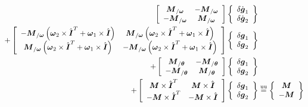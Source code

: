 \documentclass[10pt,dvips,fleqn,subeqn]{report}
\newcommand{\T}[1]{\boldsymbol{#1}}
\newcommand{\equu}{\overset{\text{uu}}{=}}
\begin{document}
\begin{align}
	\sqbr{\matr{cc}{
		\T{M}_{/\T{\omega}} & - \T{M}_{/\T{\omega}} \\
		- \T{M}_{/\T{\omega}} & \T{M}_{/\T{\omega}}
	}} \cubr{\cvvect{
		\delta\dot{\T{g}}_1 \\
		\delta\dot{\T{g}}_2
	}} & \nonumber \\
	+ \sqbr{\matr{cc}{
		- \T{M}_{/\T{\omega}} \plbr{\T{\omega}_2 \times \hat{\T{I}}^T + \T{\omega}_1\times \hat{\T{I}}}
			& \T{M}_{/\T{\omega}} \plbr{\T{\omega}_2 \times \hat{\T{I}}^T + \T{\omega}_1\times \hat{\T{I}}} \\
		\T{M}_{/\T{\omega}} \plbr{\T{\omega}_2\times \hat{\T{I}}^T + \T{\omega}_1\times \hat{\T{I}}}
			& - \T{M}_{/\T{\omega}} \plbr{\T{\omega}_2 \times \hat{\T{I}}^T + \T{\omega}_1\times \hat{\T{I}}}
	}} \cubr{\cvvect{
		\delta\T{g}_1 \\
		\delta\T{g}_2
	}} & \nonumber \\
	+ \sqbr{\matr{cc}{
		\T{M}_{/\T{\theta}} & - \T{M}_{/\T{\theta}} \\
		- \T{M}_{/\T{\theta}} & \T{M}_{/\T{\theta}}
	}} \cubr{\cvvect{
		\delta\T{g}_1 \\
		\delta\T{g}_2
	}} & \nonumber \\
	+ \sqbr{\matr{cc}{
		\T{M} \times \hat{\T{I}}^T & \T{M} \times \hat{\T{I}} \\
		- \T{M} \times \hat{\T{I}}^T & - \T{M} \times \hat{\T{I}}
	}} \cubr{\cvvect{
		\delta\T{g}_1 \\
		\delta\T{g}_2
	}} &\equu \cubr{\cvvect{
		\T{M} \\
		- \T{M}
	}}
\end{align}
\end{document}
